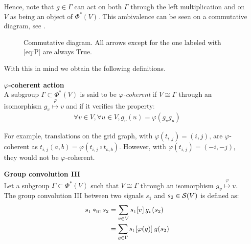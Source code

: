 Hence, note that $g \in \Gamma$ can act on both $\Gamma$ through the left multiplication and on $V$ as being an object of $\Phi^{*}(V)$. This ambivalence can be seen on a commutative diagram, see .%

\begin{figure}[H]
\centering
{}
\caption{Commutative diagram. All arrows except for the one labeled with \ref{eq:P} are always True.}
\label{fig:com}
\end{figure}

With this in mind we obtain the following definitions.

\begin{definition}\textbf{$\varphi$-coherent action}\\
A subgroup $\Gamma \subset \Phi^*(V)$ is said to be \emph{$\varphi$-coherent} if $V \cong \Gamma$ through an isomorphism $g_v \overset{\varphi}\mapsto v$  and if it verifies the property:
\begin{gather*}
\forall v \in V, \forall u \in V, g_v(u) = \varphi(g_vg_u) \tag{P}\label{eq:P}
\end{gather*}
\end{definition}

\begin{remark}
For example, translations on the grid graph, with $\varphi(t_{i,j}) = (i,j)$, are $\varphi$-coherent as $t_{i,j}(a,b) = \varphi(t_{i,j} \circ t_{a,b})$. However, with $\varphi(t_{i,j}) = (-i,-j)$, they would not be $\varphi$-coherent.
\end{remark}

\begin{definition}\textbf{Group convolution III}\\
Let a subgroup $\Gamma \subset \Phi^*(V)$ such that $V \cong \Gamma$ through an isomorphism $g_v \overset{\varphi}\mapsto v$.
The group convolution III between two signals $s_1$ and $s_2 \in \cs(V)$ is defined as:
\begin{align}
s_1 \ast_{\III} s_2 & = \displaystyle \sum_{v \in V} s_1[v] \h{2} g_v(s_2)\label{eq:vdom}\\
& = \displaystyle \sum_{g \in \Gamma} s_1[\varphi(g)] \h{2} g(s_2) \label{eq:premix}
\end{align}
\label{def:conv3}
\end{definition}

